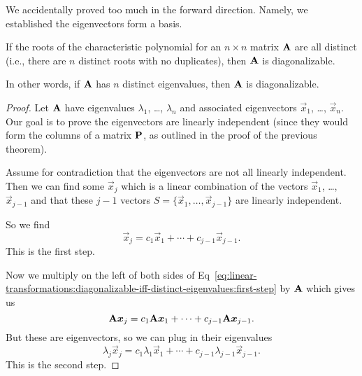 \begin{remark}
We accidentally proved too much in the forward direction. Namely, we
established the eigenvectors form a basis.
\end{remark}

\begin{theorem}
If the roots of the characteristic polynomial for an $n\times n$ matrix
$\mathbf{A}$ are all distinct (i.e., there are $n$ distinct roots with no
duplicates), then $\mathbf{A}$ is diagonalizable.
\end{theorem}

In other words, if $\mathbf{A}$ has $n$ distinct eigenvalues, then
$\mathbf{A}$ is diagonalizable.

\begin{proof}
Let $\mathbf{A}$ have eigenvalues $\lambda_{1}$, \dots, $\lambda_{n}$ and
associated eigenvectors $\vec{x}_{1}$, \dots, $\vec{x}_{n}$. Our goal is
to prove the eigenvectors are linearly independent (since they would
form the columns of a matrix $\mathbf{P}$, as outlined in the proof of the
previous theorem).

Assume for contradiction that the eigenvectors are not all linearly
independent. Then we can find some $\vec{x}_{j}$ which is a linear
combination of the vectors $\vec{x}_{1}$, \dots, $\vec{x}_{j-1}$ and
that these $j-1$ vectors $S=\{\vec{x}_{1}, \dots, \vec{x}_{j-1}\}$
are linearly independent.

So we find
\begin{equation}\label{eq:linear-transformations:diagonalizable-iff-distinct-eigenvalues:first-step}
\vec{x}_{j} = c_{1}\vec{x}_{1} + \cdots + c_{j-1}\vec{x}_{j-1}.
\end{equation}
This is the first step.

Now we multiply on the left of both sides of Eq~\eqref{eq:linear-transformations:diagonalizable-iff-distinct-eigenvalues:first-step}
by $\mathbf{A}$ which gives us
\begin{equation}
\mathbf{A}\boldsymbol{x}_{j} = c_{1}\mathbf{A}\boldsymbol{x}_{1} + \cdots + c_{j-1}\mathbf{A}\boldsymbol{x}_{j-1}.
\end{equation}
But these are eigenvectors, so we can plug in their eigenvalues
\begin{equation}\label{eq:linear-transformations:diagonalizable-iff-distinct-eigenvalues:second-step}
\lambda_{j}\vec{x}_{j} = c_{1}\lambda_{1}\vec{x}_{1} + \cdots + c_{j-1}\lambda_{j-1}\vec{x}_{j-1}.
\end{equation}
This is the second step.


\end{proof}
